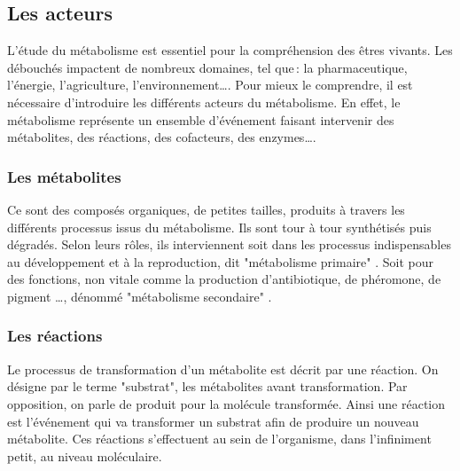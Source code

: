 \begin{refsegment}
    \subsection{Les acteurs}
    
    L'étude du métabolisme est essentiel pour la compréhension des êtres vivants. Les débouchés impactent de nombreux domaines, tel que : la pharmaceutique, l'énergie, l'agriculture, l'environnement\ldots.  Pour mieux le comprendre, il est nécessaire d'introduire les différents acteurs du métabolisme. En effet, le métabolisme représente un ensemble d'événement faisant intervenir des métabolites, des réactions, des cofacteurs, des enzymes\ldots.
    
    
    
    \subsubsection{Les métabolites}
    
    Ce sont des composés organiques, de petites tailles, produits à travers les différents processus issus du métabolisme. Ils sont tour à tour synthétisés puis dégradés. Selon leurs rôles, ils interviennent soit dans les processus indispensables au développement et à la reproduction, dit "métabolisme primaire" . Soit pour des fonctions, non vitale comme la production d'antibiotique, de phéromone, de pigment \ldots, dénommé "métabolisme secondaire" .
    
      

	\subsubsection{Les réactions}
	Le processus de transformation d’un métabolite est décrit par une réaction. On désigne par le terme "substrat", les métabolites avant transformation. Par opposition, on parle de produit pour la molécule transformée. Ainsi une réaction est l'événement qui va transformer un substrat afin de produire un nouveau métabolite. Ces réactions s'effectuent au sein de l'organisme, dans l'infiniment petit, au niveau moléculaire.
    

\end{refsegment}
